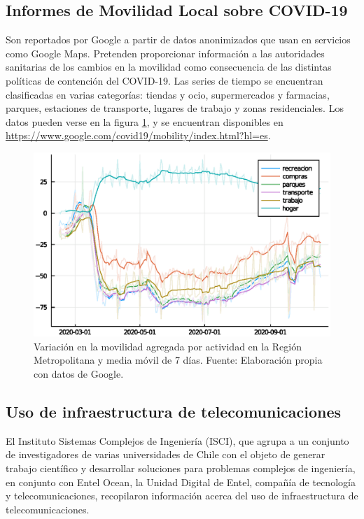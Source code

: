 \subsection{Informes de Movilidad Local sobre COVID-19}\label{sec:google}

Son reportados por Google a partir de datos anonimizados que usan en servicios como Google Maps. Pretenden proporcionar información a las autoridades sanitarias de los cambios en la movilidad como consecuencia de las distintas políticas de contención del COVID-19. Las series de tiempo se encuentran clasificadas en varias categorías: tiendas y ocio, supermercados y farmacias, parques, estaciones de transporte, lugares de trabajo y zonas residenciales. Los datos pueden verse en la figura \ref{img:google-movilidad-RM}, y se encuentran disponibles en \url{https://www.google.com/covid19/mobility/index.html?hl=es}.

\begin{figure}[H]
\centering
\includegraphics[width=.7\textwidth]{img/metodologia/datos/explorar_movilidad_google_6_1.eps}
\caption{Variación en la movilidad agregada por actividad en la Región Metropolitana y media móvil de 7 días. Fuente: Elaboración propia con datos de Google.}
\label{img:google-movilidad-RM}
\end{figure}


\subsection{Uso de infraestructura de telecomunicaciones}\label{data:isci}

El Instituto Sistemas Complejos de Ingeniería (ISCI), que agrupa a un conjunto de investigadores de varias universidades de Chile con el objeto de generar trabajo científico y desarrollar soluciones para problemas complejos de ingeniería,
 en conjunto con Entel Ocean, la Unidad Digital de Entel, 
compañía de tecnología y telecomunicaciones, recopilaron información acerca del uso de infraestructura de telecomunicaciones.

